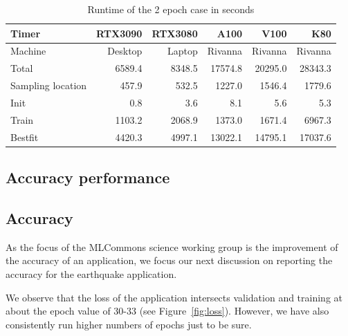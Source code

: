 \documentclass[utf8]{FrontiersinVancouver} %
\begin{document}
\begin{table}[htb]
    \caption{Runtime of the 2 epoch case in seconds}
    \label{tab:2-epoch-case}
    \begin{center}
    {\footnotesize              

          \begin{tabular}{lrrrrr}
            Timer             & RTX3090 & RTX3080 & A100    & V100    & K80     \\
            \hline
            Machine           & Desktop & Laptop  & Rivanna & Rivanna & Rivanna \\
            Total             & 6589.4  & 8348.5  & 17574.8 & 20295.0 & 28343.3 \\
            Sampling location &  457.9  &  532.5  &  1227.0 &  1546.4 &  1779.6 \\
            Init              &    0.8  &    3.6  &    8.1  &     5.6 &     5.3 \\
            Train             & 1103.2  & 2068.9  &  1373.0 &  1671.4 &  6967.3 \\
            Bestfit           & 4420.3  & 4997.1  & 13022.1 & 14795.1 & 17037.6 \\
            \hline
          \end{tabular}

    }
    \end{center}
\end{table}


\subsection{Accuracy performance}
\subsection{Accuracy}
\label{sec:perf-accuracy}



As the focus of the MLCommons science working group is the improvement
of the accuracy of an application, we focus our next discussion on
reporting the accuracy for the earthquake application.

We observe that the loss of the application intersects validation and
training at about the epoch value of 30-33 (see Figure~\ref{fig:loss}). However, we have
also consistently run higher numbers of epochs just to be sure.
\end{document}
